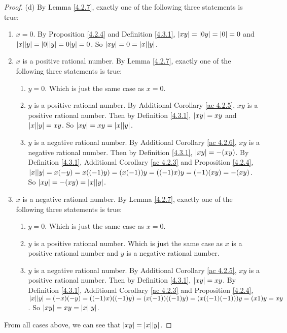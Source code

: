 \begin{proof}{(d)}
By Lemma \ref{4.2.7}, exactly one of the following three statements is true:
\begin{enumerate}[label=(\Roman*)]
    \item \(x = 0\).
    By Proposition \ref{4.2.4} and Definition \ref{4.3.1}, \(\abs*{xy} = \abs*{0y} = \abs*{0} = 0\) and \(\abs*{x}\abs*{y} = \abs*{0}\abs*{y} = 0\abs*{y} = 0\).
    So \(\abs*{xy} = 0 = \abs*{x}\abs*{y}\).
    \item \(x\) is a positive rational number.
    By Lemma \ref{4.2.7}, exactly one of the following three statements is true:
    \begin{enumerate}[label=(\roman*)]
        \item \(y = 0\).
        Which is just the same case as \(x = 0\).
        \item \(y\) is a positive rational number.
        By Additional Corollary \ref{ac 4.2.5}, \(xy\) is a positive rational number.
        Then by Definition \ref{4.3.1}, \(\abs*{xy} = xy\) and \(\abs*{x}\abs*{y} = xy\).
        So \(\abs*{xy} = xy = \abs*{x}\abs*{y}\).
        \item \(y\) is a negative rational number.
        By Additional Corollary \ref{ac 4.2.6}, \(xy\) is a negative rational number.
        Then by Definition \ref{4.3.1}, \(\abs*{xy} = -(xy)\).
        By Definition \ref{4.3.1}, Additional Corollary \ref{ac 4.2.3} and Proposition \ref{4.2.4}, \(\abs*{x}\abs*{y} = x(-y) = x((-1)y) = (x(-1))y = ((-1)x)y = (-1)(xy) = -(xy)\).
        So \(\abs*{xy} = -(xy) = \abs*{x}\abs*{y}\).
    \end{enumerate}
    \item \(x\) is a negative rational number.
    By Lemma \ref{4.2.7}, exactly one of the following three statements is true:
    \begin{enumerate}[label=(\roman*)]
        \item \(y = 0\).
        Which is just the same case as \(x = 0\).
        \item \(y\) is a positive rational number.
        Which is just the same case as \(x\) is a positive rational number and \(y\) is a negative rational number.
        \item \(y\) is a negative rational number.
        By Additional Corollary \ref{ac 4.2.5}, \(xy\) is a positive rational number.
        Then by Definition \ref{4.3.1}, \(\abs*{xy} = xy\).
        By Definition \ref{4.3.1}, Additional Corollary \ref{ac 4.2.3} and Proposition \ref{4.2.4}, \(\abs*{x}\abs*{y} = (-x)(-y) = ((-1)x)((-1)y) = (x(-1))((-1)y) = (x((-1)(-1)))y = (x1)y = xy\).
        So \(\abs*{xy} = xy = \abs*{x}\abs*{y}\).
    \end{enumerate}
\end{enumerate}
From all cases above, we can see that \(\abs*{xy} = \abs*{x}\abs*{y}\).


\end{proof}

